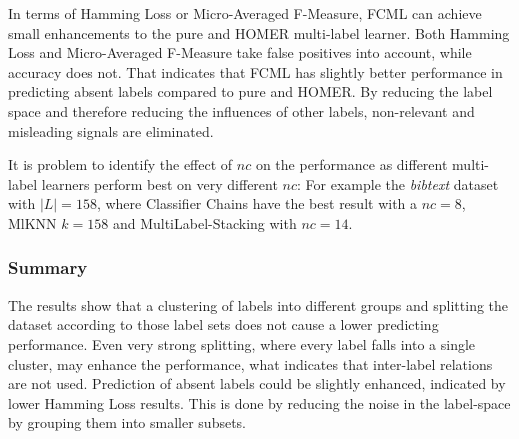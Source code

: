 			In terms of Hamming Loss or Micro-Averaged F-Measure, FCML can achieve small enhancements to the pure and HOMER multi-label learner. Both Hamming Loss and Micro-Averaged F-Measure take false positives into account, while accuracy does not. That indicates that FCML has slightly better performance in predicting absent labels compared to pure and HOMER. By reducing the label space and therefore reducing the influences of other labels, non-relevant and misleading signals are eliminated.

			It is problem to identify the effect of $nc$ on the performance as different multi-label learners perform best on very different $nc$: For example the \textit{bibtext} dataset with $|L|=158$, where Classifier Chains have the best result with a $nc=8$, MlKNN $k=158$ and MultiLabel-Stacking with $nc=14$.

			\subsubsection{Summary}

				The results show that a clustering of labels into different groups and splitting the dataset according to those label sets does not cause a lower predicting performance. Even very strong splitting, where every label falls into a single cluster, may enhance the performance, what indicates that inter-label relations are not used. Prediction of absent labels could be slightly enhanced, indicated by lower Hamming Loss results. This is done by reducing the noise in the label-space by grouping them into smaller subsets.
